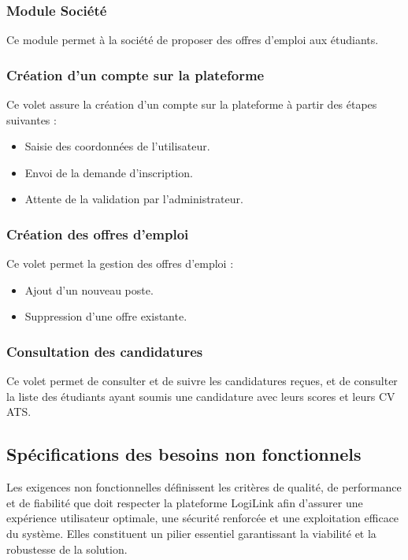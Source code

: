 \subsubsection{Module  Société }

Ce module permet à la société de proposer des offres d’emploi aux étudiants. 

\subsubsection*{Création d'un compte sur la plateforme}
Ce volet assure la création d’un compte sur la plateforme à partir des étapes suivantes : 
\begin{itemize}
  \item Saisie des coordonnées de l'utilisateur.
  \item Envoi de la demande d'inscription.
  \item Attente de la validation par l'administrateur.
\end{itemize}

\subsubsection*{Création des offres d'emploi}
Ce volet permet la gestion des offres d’emploi : 
\begin{itemize}
  \item Ajout d'un nouveau poste.
  \item Suppression d'une offre existante.
\end{itemize}

\subsubsection*{Consultation des candidatures}
Ce volet permet de consulter et de suivre les candidatures reçues, et de consulter la liste des étudiants ayant soumis une candidature avec leurs scores et leurs CV ATS. 





\subsection{Spécifications des besoins non fonctionnels}

Les exigences non fonctionnelles définissent les critères de qualité, de performance et de fiabilité que doit respecter la plateforme LogiLink afin d'assurer une expérience utilisateur optimale, une sécurité renforcée et une exploitation efficace du système. Elles constituent un pilier essentiel garantissant la viabilité et la robustesse de la solution.

